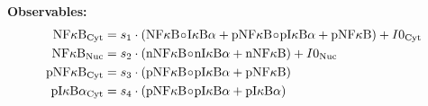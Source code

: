 \documentclass[portrait,final, fontscale=.34]{baposter}
\begin{document}
\begin{poster}
{%
\textbf{Observables:}
\begin{align*}
		\nfkb{}_\text{Cyt} &= s_1\cdot(\nfkb{}\!\circ\!\ikba{} + \text{p}\nfkb{}\!\circ\!\text{p}\ikba{} + \text{p}\nfkb{}) + I0_\text{Cyt}\\	
		\nfkb{}_\text{Nuc} &= s_2\cdot(\text{n}\nfkb{}\!\circ\!\text{n}\ikba{} + \text{n}\nfkb{}) + I0_\text{Nuc}\\
		\text{p}\nfkb{}_\text{Cyt} &= s_3\cdot(\text{p}\nfkb{}\!\circ\!\text{p}\ikba{} + \text{p}\nfkb{})\\
		\text{p}\ikba{}_\text{Cyt} &= s_4\cdot(\text{p}\nfkb{}\!\circ\!\text{p}\ikba{} + \text{p}\ikba{})
\end{align*}
}



\end{poster}
\end{document}
